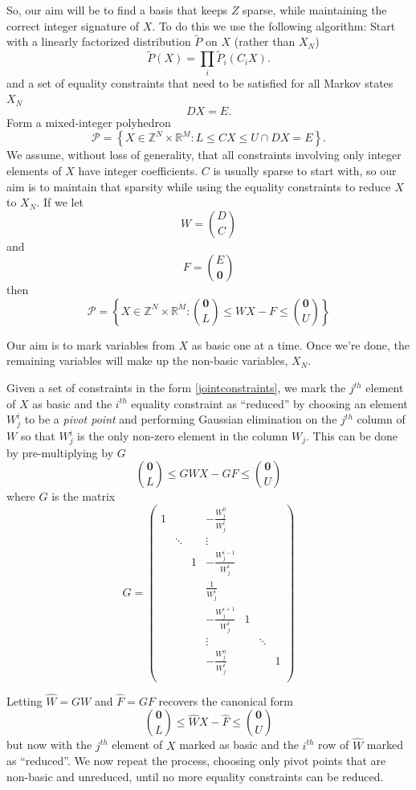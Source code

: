 \documentclass{article}
\begin{document}
So, our aim will be to find a basis that keeps $Z$ sparse, while maintaining the correct integer signature of $X$. To do this we use the following algorithm: Start with a linearly factorized distribution $\tilde{P}$ on $X$ (rather than $X_N$)
\[
\tilde{P}(X) = \prod_i \tilde{P}_i(C_iX).
\]
and a set of equality constraints that need to be satisfied for all Markov states $X_N$
\[
DX = E.
\]
Form a mixed-integer polyhedron
\[
\mathcal{P} = \left\{X \in \mathbb{Z}^N \times \mathbb{R}^M: L \le CX \le U \cap DX = E \right\}.
\]
We assume, without loss of generality, that all constraints involving only integer elements of $X$ have integer coefficients. $C$ is usually sparse to start with, so our aim is to maintain that sparsity while using the equality constraints to reduce $X$ to $X_N$. If we let
\[
W= {D \choose C}
\]
and
\[
F = {E \choose \mathbf{0}}
\]
then
\begin{equation}
\mathcal{P} = \left\{X \in \mathbb{Z}^N \times \mathbb{R}^M: {\mathbf{0} \choose L} \le W X - F \le {\mathbf{0} \choose U} \right\}
\label{jointconstraints}
\end{equation}

Our aim is to mark variables from $X$ as basic one at a time. Once we're done, the remaining variables will make up the non-basic variables, $X_N$.

Given a set of constraints in the form \eqref{jointconstraints}, we mark the $j^{th}$ element of $X$ as basic and the $i^{th}$ equality constraint as ``reduced'' by choosing an element $W^i_j$ to be a \textit{pivot point} and performing Gaussian elimination on the $j^{th}$ column of $W$ so that $W^i_j$ is the only non-zero element in the column $W_j$. This can be done by pre-multiplying by $G$
\[
{\mathbf{0} \choose L} \le GWX - GF \le {\mathbf{0} \choose U}
\]
where $G$ is the matrix
\[
G =  
\begin{pmatrix}
1 &  & &-\frac{W^0_j}{W^i_j} & & &\\
& \ddots & &\vdots & & &\\
& & 1 & -\frac{W^{i-1}_j}{W^i_j} & & &\\
& & & \frac{1}{W^i_j} & & &\\
& &  & -\frac{W^{i+1}_j}{W^i_j} & 1 & &\\
& & & \vdots & & \ddots &\\
& & & -\frac{W^n_j}{W^i_j} & & &1\\
\end{pmatrix}
\]

Letting $\hat{W} = GW$ and $\hat{F} = GF$ recovers the canonical form
\begin{equation}
{\mathbf{0} \choose L} \le \hat{W}X - \hat{F} \le {\mathbf{0} \choose U}
\label{eliminatedConstraint}
\end{equation}
but now with the $j^{th}$ element of $X$ marked as basic and the $i^{th}$ row of $\hat{W}$ marked as ``reduced''. We now repeat the process, choosing only pivot points that are non-basic and unreduced, until no more equality constraints can be reduced.
\end{document}
